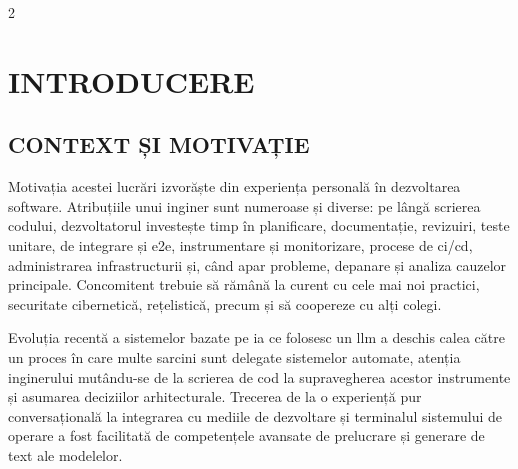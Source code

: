 \documentclass[12pt, a4paper, oneside, romanian]{teza-upb}
\renewcommand{\headrulewidth}{0pt}%
\begin{document}
\makeatother


\beforepreface

\listoffigures
\listoftables

\begingroup
\scriptsize
\begin{multicols}{2}
\printacronyms[heading=none]
\end{multicols}
\endgroup

\newpage
\makeatletter
\afterprefacetrue
\makeatother
\fancypagestyle{plain}{%
  \fancyhf{}%
  \fancyfoot[C]{\thepage}%
  \renewcommand{\headrulewidth}{0pt}%
}
\pagestyle{plain}


\chapter*{INTRODUCERE}

\section*{CONTEXT ȘI MOTIVAȚIE}
 
  Motivația acestei lucrări izvorăște din experiența personală în dezvoltarea software. Atribuțiile unui inginer sunt numeroase și diverse: pe lângă scrierea codului, dezvoltatorul investește timp în planificare, documentație, revizuiri, teste unitare, de integrare și \ac{e2e}, instrumentare și monitorizare, procese de \ac{ci}/\ac{cd}, administrarea infrastructurii și, când apar probleme, depanare și analiza cauzelor principale. Concomitent trebuie să rămână la curent cu cele mai noi practici, securitate cibernetică, rețelistică, precum și să coopereze cu alți colegi.

  Evoluția recentă a sistemelor bazate pe \ac{ia} ce folosesc un \ac{llm} a deschis calea către un proces în care multe sarcini sunt delegate sistemelor automate, atenția inginerului mutându-se de la scrierea de cod la supravegherea acestor instrumente și asumarea deciziilor arhitecturale. Trecerea de la o experiență pur conversațională la integrarea cu mediile de dezvoltare și terminalul sistemului de operare a fost facilitată de competențele avansate de prelucrare și generare de text ale modelelor.
\end{document}
